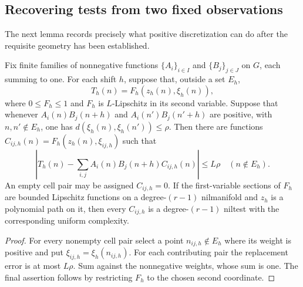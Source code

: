 \subsection{Recovering tests from two fixed observations}

The next lemma records precisely what positive discretization can
do after the requisite geometry has been established.

\begin{lemma}\label{shift:discretization}
Fix finite families of nonnegative functions
$\{A_i\}_{i\in I}$ and $\{B_j\}_{j\in J}$ on $G$, each summing
to one.  For each shift $h$, suppose that, outside a set $E_h$,
\[
 T_h(n)=F_h(z_h(n),\xi_h(n)),
\]
where $0\leq F_h\leq1$ and $F_h$ is $L$-Lipschitz in its second
variable.  Suppose that whenever
$A_i(n)B_j(n+h)$ and $A_i(n')B_j(n'+h)$ are positive, with
$n,n'\notin E_h$, one has
$d(\xi_h(n),\xi_h(n'))\leq\rho$.
Then there are functions
$C_{ij,h}(n)=F_h(z_h(n),\xi_{ij,h})$ such that
\begin{equation}\label{shift:positive-discretization}
 \left|T_h(n)-\sum_{i,j}A_i(n)B_j(n+h)C_{ij,h}(n)\right|
 \leq L\rho\quad(n\notin E_h).
\end{equation}
An empty cell pair may be assigned $C_{ij,h}=0$.
If the first-variable sections of $F_h$ are bounded Lipschitz
functions on a degree-$(r-1)$ nilmanifold and $z_h$ is a polynomial
path on it, then every $C_{ij,h}$ is a degree-$(r-1)$ niltest
with the corresponding uniform complexity.
\end{lemma}
\begin{proof}
For every nonempty cell pair select a point
$n_{ij,h}\notin E_h$ where its weight is positive and put
$\xi_{ij,h}=\xi_h(n_{ij,h})$.
For each contributing pair the replacement error is at most
$L\rho$.  Sum against the nonnegative weights, whose sum is one.
The final assertion follows by restricting $F_h$ to the chosen
second coordinate.
\end{proof}

